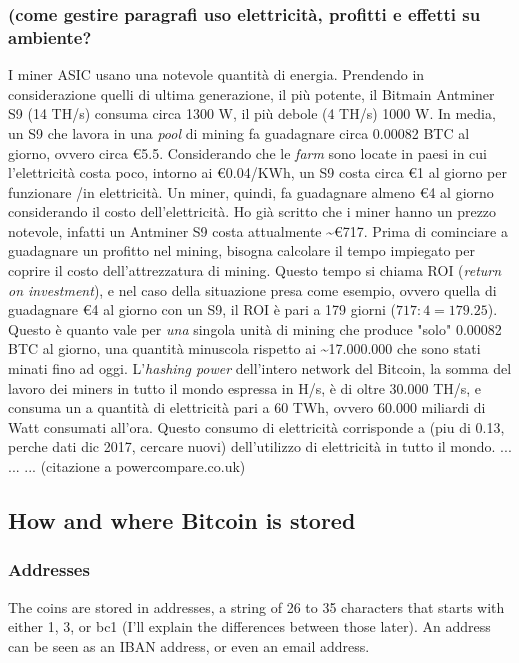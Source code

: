 \documentclass {article}
\begin{document}
\subsubsection {(come gestire paragrafi uso elettricità, profitti e effetti su ambiente?}


I miner ASIC usano una notevole quantità di energia. Prendendo in considerazione quelli di ultima generazione, il più potente, il Bitmain Antminer S9 (14 TH/s) consuma circa 1300 W, il più debole (4 TH/s) 1000 W.
In media, un S9 che lavora in una \textit{pool} di mining fa guadagnare circa 0.00082 BTC al giorno, ovvero circa \euro{5.5}.
Considerando che le \textit{farm} sono locate in paesi in cui l'elettricità costa poco, intorno ai \euro{0.04}/KWh, un S9 costa circa \euro{1} al giorno per funzionare /in elettricità.
Un miner, quindi, fa guadagnare almeno \euro{4} al giorno considerando il costo dell'elettricità.
Ho già scritto che i miner hanno un prezzo notevole, infatti un Antminer S9 costa attualmente \textasciitilde \euro{717}.
Prima di cominciare a guadagnare un profitto nel mining, bisogna calcolare il tempo impiegato per coprire il costo dell'attrezzatura di mining.
Questo tempo si chiama ROI (\textit{return on investment}), e nel caso della situazione presa come esempio, ovvero quella di guadagnare \euro{4} al giorno con un S9, il ROI è pari a 179 giorni ($717 : 4 = 179.25$).
Questo è quanto vale per \textit{una} singola unità di mining che produce "solo" 0.00082 BTC al giorno, una quantità minuscola rispetto ai \textasciitilde 17.000.000 che sono stati minati fino ad oggi.
L'\textit{hashing power} dell'intero network del Bitcoin, la somma del lavoro dei miners in tutto il mondo espressa in H/s, è di oltre 30.000 TH/s, e consuma un a quantità di elettricità pari a 60 TWh, ovvero 60.000 miliardi di Watt consumati all'ora.
Questo consumo di elettricità corrisponde a (piu di 0.13, perche dati dic 2017, cercare nuovi) dell'utilizzo di elettricità in tutto il mondo.
... ... ... (citazione a powercompare.co.uk)


\subsection {How and where Bitcoin is stored}


\subsubsection {Addresses}


The coins are stored in addresses, a string of 26 to 35 characters that starts with either 1, 3, or bc1 (I'll explain the differences between those later). An address can be seen as an IBAN address, or even an email address.
\end{document}

